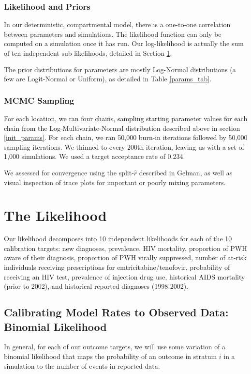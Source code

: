 \documentclass{article}
\begin{document}
\subsubsection{Likelihood and Priors}

In our deterministic, compartmental model, there is a one-to-one correlation between parameters and simulations. The likelihood function can only be computed on a simulation once it has run. Our log-likelihood is actually the sum of ten independent sub-likelihoods, detailed in Section \ref{likelihood}.

The prior distributions for parameters are mostly Log-Normal distributions (a few are Logit-Normal or Uniform), as detailed in Table \ref{params_tab}.

\subsubsection{MCMC Sampling}

For each location, we ran four chains, sampling starting parameter values for each chain from the Log-Multivariate-Normal distribution described above in section \ref{init_params}. For each chain, we ran 50,000 burn-in iterations followed by 50,000 sampling iterations. We thinned to every 200th iteration, leaving us with a set of 1,000 simulations. We used a target acceptance rate of 0.234.

We assessed for convergence using the split-$\hat{r}$ described in Gelman,\cite{gelman2014} as well as visual inspection of trace plots for important or poorly mixing parameters.




\section{The Likelihood} \label{likelihood}

Our likelihood decomposes into 10 independent likelihoods for each of the 10 calibration targets: new diagnoses, prevalence, HIV mortality, proportion of PWH aware of their diagnosis, proportion of PWH virally suppressed, number of at-risk individuals receiving prescriptions for emtricitabine/tenofovir, probability of receiving an HIV test, prevalence of injection drug use, historical AIDS mortality (prior to 2002), and historical reported diagnoses (1998-2002).

\subsection{Calibrating Model Rates to Observed Data: Binomial Likelihood}\label{binomial_likelihood}
In general, for each of our outcome targets, we will use some variation of a binomial likelihood that maps the probability of an outcome in stratum $i$ in a simulation to the number of events in reported data.
\end{document}
